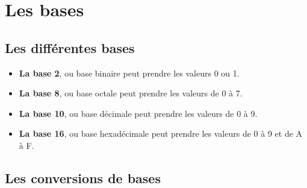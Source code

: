 \documentclass[10pt,a4paper]{article}
\begin{document}
 \section{Les bases}
 \subsection{Les différentes bases}
 \begin{itemize}
	 \item \textbf{La base 2}, ou base binaire peut prendre les valeurs 0 ou 1.
	 \item \textbf{La base 8}, ou base octale peut prendre les valeurs de 0 à 7.
	 \item \textbf{La base 10}, ou base décimale peut prendre les valeurs de 0 à 9.
	 \item \textbf{La base 16}, ou base hexadécimale peut prendre les valeurs de 0 à 9 et de A à F.
 \end{itemize}

 \subsection{Les conversions de bases}
\end{document}
